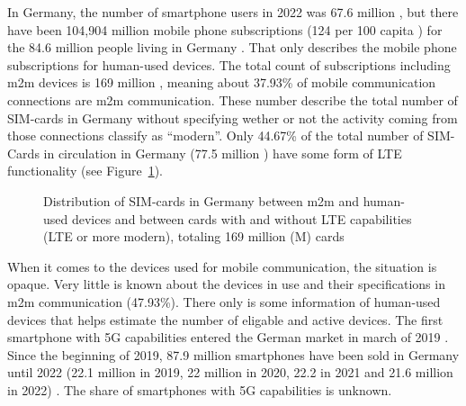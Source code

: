 \documentclass[11pt,a4paper]{article}
\begin{document}
In Germany, the number of smartphone users in 2022 was 67.6 million \citep{smartphonenutzerDeutschland}, but there have been 104,904 million mobile phone subscriptions (124 per 100 capita \citep{mobilesubscriptionsDeutschland}) for the 84.6 million people living in Germany \citep{consensusDE2022}.
That only describes the mobile phone subscriptions for human-used devices.
The total count of subscriptions including \acrshort{m2m} devices is 169 million \citep{totalmobilesubscriptionsDeutschland}, meaning about 37.93\% of mobile communication connections are \acrshort{m2m} communication.
These number describe the total number of SIM-cards in Germany without specifying wether or not the activity coming from those connections classify as \enquote{modern}.
Only 44.67\% of the total number of SIM-Cards in circulation in Germany (77.5 million \citep{simCardsDeutschland}) have some form of LTE functionality (see Figure~\ref{fig:simdistribution}).

\begin{figure}[h]


  \caption{Distribution of SIM-cards in Germany between \acrlong*{m2m} and human-used devices and between cards with and without LTE capabilities (LTE or more modern), totaling 169 million (M) cards}
  \label{fig:simdistribution}
\end{figure}

When it comes to the devices used for mobile communication, the situation is opaque.
Very little is known about the devices in use and their specifications in \acrshort{m2m} communication (47.93\%).
There only is some information of human-used devices that helps estimate the number of eligable and active devices.
The first smartphone with 5G capabilities entered the German market in march of 2019 \citep{smartphonemodells5G}.
Since the beginning of 2019, 87.9 million smartphones have been sold in Germany until 2022 (22.1 million in 2019, 22 million in 2020, 22.2 in 2021 and 21.6 million in 2022) \citep{smartphonenutzungDeutschland}.
The share of smartphones with 5G capabilities is unknown.
\end{document}
